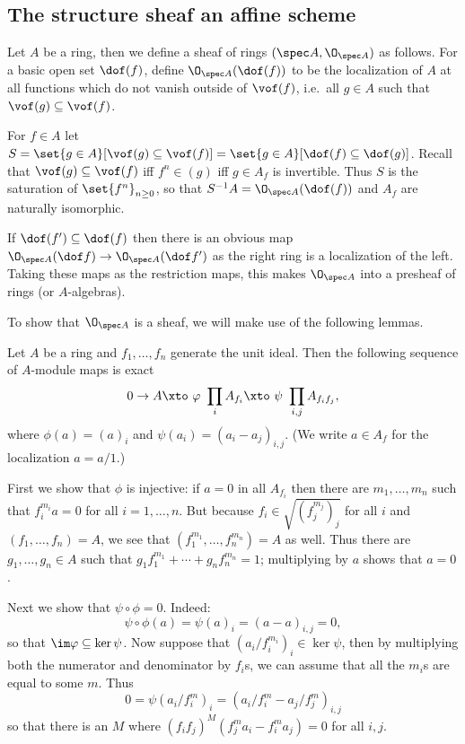 \subsection{The structure sheaf an affine scheme}

\bdefn

    Let $A$ be a ring, then we define a sheaf of rings $(\spec A,\O_{\spec A})$ as follows.
    For a basic open set $\dof(f)$, define $\O_{\spec A}(\dof(f))$ to be the localization of $A$ at all functions which do not vanish outside of $\vof(f)$, i.e.\ all $g\in A$ such that
    $\vof(g)\subseteq\vof(f)$.

\edefn

For $f\in A$ let $S=\set{g\in A}[\vof(g)\subseteq\vof(f)]=\set{g\in A}[\dof(f)\subseteq\dof(g)]$.
Recall that $\vof(g)\subseteq\vof(f)$ iff $f^n\in(g)$ iff $g\in A_f$ is invertible.
Thus $S$ is the saturation of $\set{f^n}_{n\geq0}$, so that $S^{-1}A=\O_{\spec A}(\dof(f))$ and $A_f$ are naturally isomorphic.

If $\dof(f')\subseteq\dof(f)$ then there is an obvious map $\O_{\spec A}(\dof f)\to\O_{\spec A}(\dof f')$ as the right ring is a localization of the left.
Taking these maps as the restriction maps, this makes $\O_{\spec A}$ into a presheaf of rings (or $A$-algebras).

To show that $\O_{\spec A}$ is a sheaf, we will make use of the following lemmas.

\blemm

    Let $A$ be a ring and $f_1,\dots,f_n$ generate the unit ideal.
    Then the following sequence of $A$-module maps is exact
    $$ 0 \to A \xtos\phi \prod_iA_{f_i} \xtos\psi \prod_{i,j}A_{f_if_j} , $$
    where $\phi(a)=(a)_i$ and $\psi(a_i)=(a_i-a_j)_{i,j}$.
    (We write $a\in A_f$ for the localization $a=a/1$.)

\elemm

\bproof

    First we show that $\phi$ is injective: if $a=0$ in all $A_{f_i}$ then there are $m_1,\dots,m_n$ such that $f_i^{m_i}a=0$ for all $i=1,\dots,n$.
    But because $f_i\in\sqrt{(f_j^{m_j})_j}$ for all $i$ and $(f_1,\dots,f_n)=A$, we see that $(f_1^{m_1},\dots,f_n^{m_n})=A$ as well.
    Thus there are $g_1,\dots,g_n\in A$ such that $g_1f_1^{m_1}+\cdots+g_nf_n^{m_n}=1$; multiplying by $a$ shows that $a=0$.

    Next we show that $\psi\circ\phi=0$.
    Indeed:
    $$ \psi\circ\phi(a) = \psi(a)_i = (a-a)_{i,j} = 0 , $$
    so that $\im\phi\subseteq\ker\psi$.
    Now suppose that $(a_i/f_i^{m_i})_i\in\ker\psi$, then by multiplying both the numerator and denominator by $f_i$s, we can assume that all the $m_i$s are equal to some $m$.
    Thus
    $$ 0 = \psi(a_i/f_i^m)_i = (a_i/f_i^m - a_j/f_j^m)_{i,j} $$
    so that there is an $M$ where $(f_if_j)^M(f_j^ma_i-f_i^ma_j)=0$ for all $i,j$.

